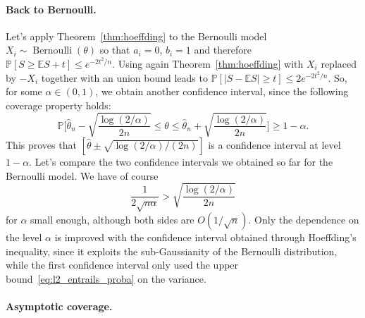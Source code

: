 \documentclass[
	fontsize=11pt, %
	twoside=false, %
	numbers=noenddot, %
]{kaobook}
\DeclareMathOperator{\ber}{Bernoulli}
\renewcommand{\P}{\mathbb P}
\newcommand{\E}{\mathbb E}
\newcommand{\wh}{\widehat}
\begin{document}
\paragraph{Back to Bernoulli.} %

Let's apply Theorem~\ref{thm:hoeffding} to the Bernoulli model $X_i \sim \ber(\theta)$ so that $a_i = 0$, $b_i = 1$ and therefore $\P[ S \geq \E S + t] \leq e^{-2 t^2 / n}$.
Using again Theorem~\ref{thm:hoeffding} with $X_i$ replaced by $-X_i$ together with an union bound%
\sidenote{}%
leads to $\P[ | S - \E S | \geq t] \leq 2 e^{-2 t^2 / n}$.
So, for some $\alpha \in (0, 1)$, we obtain another confidence interval, since the following coverage property holds:
\begin{equation*}
	\P \bigg[ \wh \theta_n - \sqrt{\frac{\log(2 / \alpha)}{2n}} \leq \theta \leq \wh \theta_n 
	+ \sqrt{\frac{\log(2 / \alpha)}{2n}} \bigg] \geq 1 - \alpha.
\end{equation*}
This proves that $[\wh \theta \pm \sqrt{\log(2 / \alpha) / (2n)}]$ is a confidence interval at level $1 - \alpha$.%
Let's compare the two confidence intervals we obtained so far for the Bernoulli model.
We have of course
\begin{equation*}
	\frac{1}{2 \sqrt{n \alpha}} > \sqrt{\frac{\log(2 / \alpha)}{2n}} 
\end{equation*}
for $\alpha$ small enough, although both sides are $O(1 / \sqrt n)$.
Only the dependence on the level $\alpha$ is improved with the confidence interval obtained through Hoeffding's inequality, since it exploits the sub-Gaussianity of the Bernoulli distribution, while the first confidence interval only used the upper bound~\eqref{eq:l2_entrails_proba} on the variance.%

\paragraph{Asymptotic coverage.}
\end{document}
